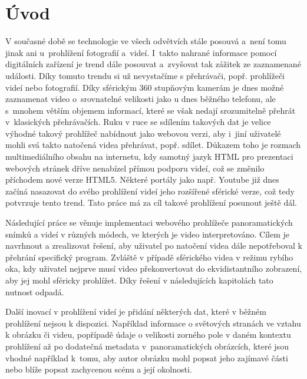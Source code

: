 


\chapter{Úvod}
\label{chapter:1}

V současné době se technologie ve všech odvětvích stále posouvá a~není tomu jinak ani u~prohlížení fotografií a~videí. I~takto nahrané informace pomocí digitálních zařízení je trend dále posouvat a~zvyšovat tak zážitek ze zaznamenané události. Díky tomuto trendu si už nevystačíme s  přehrávači, popř. prohlížeči videí nebo fotografií. Díky sférickým 360 stupňovým kamerám je dnes možné zaznamenat video o~srovnatelné velikosti jako u dnes běžného telefonu, ale s~mnohem větším objemem informací, které se však nedají srozumitelně přehrát v~klasických přehrávačích. Ruku v ruce se sdílením takových dat je velice výhodné takový prohlížeč nabídnout jako webovou verzi, aby i~jiní uživatelé mohli svá takto natočená videa přehrávat, popř. sdílet. Důkazem toho je rozmach multimediálního obsahu na internetu, kdy samotný jazyk HTML pro prezentaci webových stránek dříve nenabízel přímou podporu videí, což se změnilo příchodem nové verze HTML5. Některé portály jako např. Youtube již dnes začíná nasazovat do svého prohlížení videí jeho rozšířené sférické verze, což tedy potvrzuje tento trend. Tato práce má za cíl takové prohlížení posunout ještě dál.


Následující práce se věnuje implementaci webového prohlížeče panoramatických snímků a videí v různých módech, ve kterých je video interpretováno. Cílem je  navrhnout a zrealizovat řešení, aby uživatel po natočení videa dále nepotřeboval k přehrání specifický program. Zvláště v případě  sférického videa v režimu rybího oka, kdy uživatel nejprve musí video překonvertovat do ekvidistantního zobrazení, aby jej mohl sféricky prohlížet. Díky řešení v následujících kapitolách tato nutnost odpadá. 


Další inovací v prohlížení videí je přidání některých dat, které v běžném prohlížení nejsou k dispozici. Například informace o světových stranách ve vztahu k obrázku či videu, popřípadě údaje o velikosti zorného pole v daném kontextu prohlížení až po dodatečná metadata v~panoramatických obrázcích, které jsou vhodné například k~tomu, aby autor obrázku mohl popsat jeho zajímavé části nebo blíže popsat zachycenou scénu a její okolnosti.
\newline


